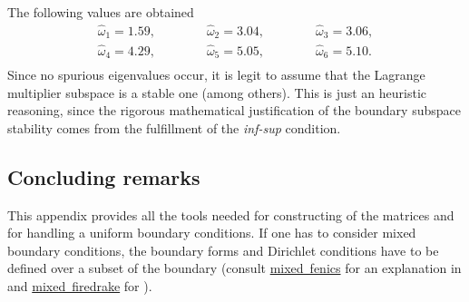 The following values are obtained 
\begin{align*}
\widehat{\omega}_1 = 1.59, \qquad\qquad \widehat{\omega}_2 = 3.04, \qquad\qquad \widehat{\omega}_3 = 3.06, \\
\widehat{\omega}_4 = 4.29, \qquad\qquad \widehat{\omega}_5 = 5.05, \qquad\qquad \widehat{\omega}_6 = 5.10. \\
\end{align*}
Since no spurious eigenvalues occur, it is legit to assume that the Lagrange multiplier subspace is a stable one (among others). This is just an heuristic reasoning, since the rigorous mathematical justification of the boundary subspace stability comes from the fulfillment of the \textit{inf-sup} condition.

\subsection*{Concluding remarks}
This appendix provides all the tools needed for constructing of the matrices and for handling a uniform boundary conditions. If one has to consider mixed boundary conditions, the boundary forms and Dirichlet conditions have to be defined over a subset of the boundary (consult \href{https://fenicsproject.org/pub/tutorial/sphinx1/._ftut1005.html}{mixed~fenics} for an explanation in \fenics and \href{https://www.firedrakeproject.org/variational-problems.html}{mixed~firedrake} for \firedrake). 